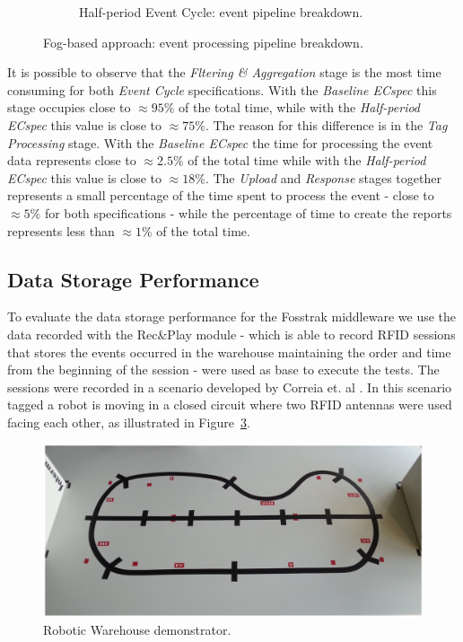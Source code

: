 \begin{figure}[ht!]
\begin{subfigure}{.5\textwidth}
    \caption{Half-period Event Cycle: event pipeline breakdown.}
    \label{fig:ecspec_effective_half}
  \end{subfigure}
  \caption[Fog-based approach: event processing breakdown.]{Fog-based approach: event processing pipeline breakdown.}
  \label{fig:ecspec_effective_breakdown}
\end{figure}

It is possible to observe that the \textit{Fltering \& Aggregation} stage is the most time consuming
for both \textit{Event Cycle} specifications. With the \textit{Baseline ECspec} this stage occupies
close to $\approx95\%$ of the total time, while with the \textit{Half-period ECspec} this value is
close to $\approx75\%$. The reason for this difference is in the \textit{Tag Processing} stage.
With the \textit{Baseline ECspec} the time for processing the event data represents close to $\approx2.5\%$
of the total time while with the \textit{Half-period ECspec} this value is close to $\approx18\%$.
The \textit{Upload} and \textit{Response} stages together represents a small percentage of
the time spent to process the event - close to $\approx5\%$ for both specifications - while the percentage
of time to create the reports represents less than $\approx1\%$ of the total time.

\subsection{Data Storage Performance}
\label{sub:eval_exp_data}
To evaluate the data storage performance for the Fosstrak middleware we use the data recorded with the Rec\&Play
module - which is able to record \gls{RFID} sessions that stores the events occurred in the warehouse
maintaining the order and time from the beginning of the session - were used as base to execute
the tests. The sessions were recorded in a scenario developed by Correia et. al \cite{Correia:Thesis:2014}.
In this scenario tagged a robot is moving in a closed circuit where two \gls{RFID} antennas were used
facing each other, as illustrated in Figure~\ref{fig:robotic_warehouse}.\\

\begin{figure}[ht!]
  \centering
  \includegraphics[width=\textwidth]{./images/robotic_warehouse}
  \caption[Robotic Warehouse demonstrator.]{Robotic Warehouse demonstrator.}
  \label{fig:robotic_warehouse}
\end{figure}

